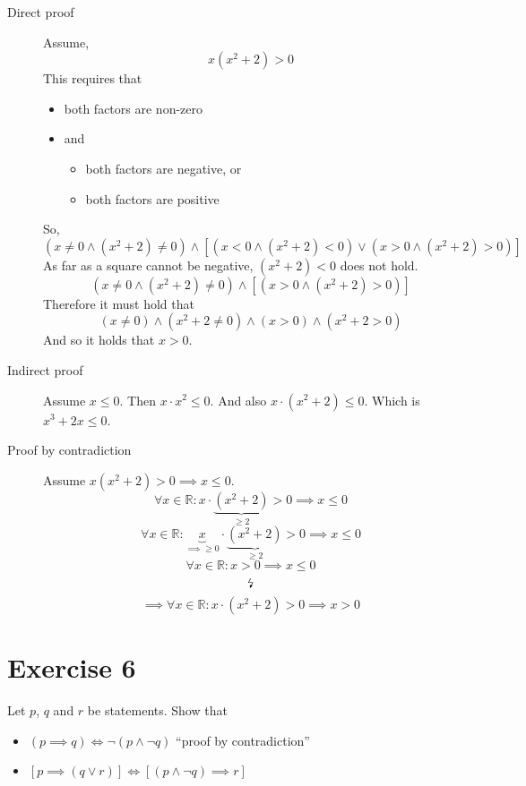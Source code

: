\documentclass[a4paper]{article}
\theoremstyle{definition}
\begin{document}
\begin{description}
  \item[Direct proof]
    Assume,
    \[ x(x^2 + 2) > 0 \]
    This requires that
    \begin{itemize}
      \item both factors are non-zero
      \item and
        \begin{itemize}
          \item both factors are negative, or
          \item both factors are positive
        \end{itemize}
    \end{itemize}
    So,
    \[ (x \neq 0 \land (x^2 + 2) \neq 0) \land \left[(x < 0 \land (x^2 + 2) < 0) \lor (x > 0 \land (x^2 + 2) > 0)\right] \]
    As far as a square cannot be negative, $(x^2 + 2) < 0$ does not hold.
    \[ (x \neq 0 \land (x^2 + 2) \neq 0) \land \left[(x > 0 \land (x^2 + 2) > 0)\right] \]
    Therefore it must hold that
    \[ (x \neq 0) \land (x^2 + 2 \neq 0) \land (x > 0) \land (x^2 + 2 > 0) \]
    And so it holds that $x > 0$.
  \item[Indirect proof]
    Assume $x \leq 0$.
    Then $x \cdot x^2 \leq 0$.
    And also $x \cdot (x^2 + 2) \leq 0$.
    Which is $x^3 + 2x \leq 0$.
  \item[Proof by contradiction]
    Assume $x (x^2 + 2) > 0 \implies x \leq 0$.
    \[ \forall x \in \mathbb R: x \cdot \underbrace{(x^2 + 2)}_{\geq 2} > 0 \implies x \leq 0 \]
    \[ \forall x \in \mathbb R: \underbrace{x}_{\implies \geq 0} \cdot \underbrace{(x^2 + 2)}_{\geq 2} > 0 \implies x \leq 0 \]
    \[ \forall x \in \mathbb R: x > 0 \implies x \leq 0 \]
    \[ \text{\lightning} \]
    \[ \implies \forall x \in \mathbb R: x \cdot (x^2 + 2) > 0 \implies x > 0 \]
\end{description}

\section{Exercise 6}

\begin{ex}
  Let $p$, $q$ and $r$ be statements. Show that
  \begin{itemize}
    \item $(p \implies q) \iff \neg (p \land \neg q)$  \hspace{30pt} \enquote{proof by contradiction}
    \item $\left[p \implies (q \lor r)\right] \iff \left[(p \land \neg q) \implies r\right]$
  \end{itemize}
\end{ex}
\end{document}
